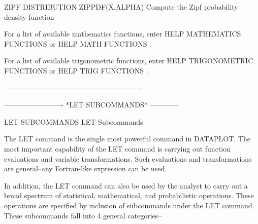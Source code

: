 ZIPF DISTRIBUTION
   ZIPPDF(X,ALPHA)    Compute the Zipf probability density function

For a list of available mathematics functions, enter HELP MATHEMATICS
FUNCTIONS or HELP MATH FUNCTIONS   .
 
For a list of available trigonometric functions, enter HELP
TRIGONOMETRIC FUNCTIONS or HELP TRIG FUNCTIONS   .
 
----------------------------------------------------------
 
 
 
 
 
 
 
 
 
 
 
 
 
 
 
 
 
 
 
 
 
 
 
 












































-------------------------  *LET SUBCOMMANDS*  ------------
 
LET SUBCOMMANDS
LET Subcommands
 
The LET command is the single most powerful command in DATAPLOT. The
most important capability of the LET command is carrying out function
evaluations and variable transformations.  Such evaluations and
transformations are general--any Fortran-like expression can be used.
 
In addition, the LET command can also be used by the analyst to carry
out a broad spectrum of statistical,  mathematical,  and  probabilistic
operations.  These operations are specified by inclusion of subcommands
under the LET command.  These subcommands fall into 4 general
categories--
 
